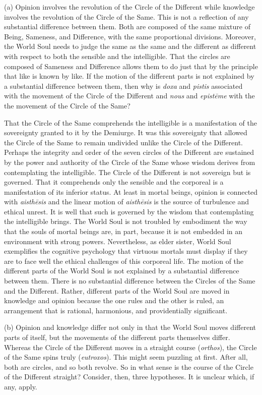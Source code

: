 (a) Opinion involves the revolution of the Circle of the Different while knowledge involves the revolution of the Circle of the Same. This is not a reflection of any substantial difference between them. Both are composed of the same mixture of Being, Sameness, and Difference, with the same proportional divisions. Moreover, the World Soul needs to judge the same as the same and the different as different with respect to both the sensible and the intelligible. That the circles are composed of Sameness and Difference allows them to do just that by the principle that like is known by like. If the motion of the different parts is not explained by a substantial difference between them, then why is \emph{doxa} and \emph{pistis} associated with the movement of the Circle of the Different and \emph{nous} and \emph{epistēme} with the the movement of the Circle of the Same?

That the Circle of the Same comprehends the intelligible is a manifestation of the sovereignty granted to it by the Demiurge. It was this sovereignty that allowed the Circle of the Same to remain undivided unlike the Circle of the Different. Perhaps the integrity and order of the seven circles of the Different are sustained by the power and authority of the Circle of the Same whose wisdom derives from contemplating the intelligible. The Circle of the Different is not sovereign but is governed. That it comprehends only the sensible and the corporeal is a manifestation of its inferior status. At least in mortal beings, opinion is connected with \emph{aisthēsis} and the linear motion of \emph{aisthēsis} is the source of turbulence and ethical unrest. It is well that such is governed by the wisdom that contemplating the intelligible brings. The World Soul is not troubled by embodiment the way that the souls of mortal beings are, in part, because it is not embedded in an environment with strong powers. Nevertheless, as elder sister, World Soul exemplifies the cognitive psychology that virtuous mortals must display if they are to face well the ethical challenges of this corporeal life. The motion of the different parts of the World Soul is not explained by a substantial difference between them. There is no substantial difference between the Circles of the Same and the Different. Rather, different parts of the World Soul are moved in knowledge and opinion because the one rules and the other is ruled, an arrangement that is rational, harmonious, and providentially significant.

(b) Opinion and knowledge differ not only in that the World Soul moves different parts of itself, but the movements of the different parts themselves differ. Whereas the Circle of the Different moves in a straight course (\emph{orthos}), the Circle of the Same spins truly (\emph{eutroxos}). This might seem puzzling at first. After all, both are circles, and so both revolve. So in what sense is the course of the Circle of the Different straight? Consider, then, three hypotheses. It is unclear which, if any, apply.

